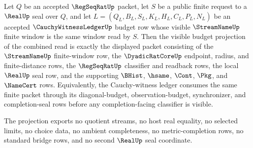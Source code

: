 \begin{theorem}
\label{thm:real-regseqrat-streamname-cauchy-witness-budget-projection}
Let $Q$ be an accepted $\RegSeqRatUp$ packet, let $S$ be a public finite request to a $\RealUp$ seal over $Q$, and let $L=(Q_L,B_L,S_L,K_L,H_L,C_L,P_L,N_L)$ be an accepted $\CauchyWitnessLedgerUp$ budget row whose visible $\StreamNameUp$ finite window is the same window read by $S$. Then the visible budget projection of the combined read is exactly the displayed packet consisting of the $\StreamNameUp$ finite-window row, the $\DyadicRatCoreUp$ endpoint, radius, and finite-distance rows, the $\RegSeqRatUp$ classifier and readback rows, the local $\RealUp$ seal row, and the supporting $\BHist$, $\hsame$, $\Cont$, $\Pkg$, and $\NameCert$ rows. Equivalently, the Cauchy-witness ledger consumes the same finite packet through its diagonal-budget, observation-budget, synchronizer, and completion-seal rows before any completion-facing classifier is visible.

The projection exports no quotient streams, no host real equality, no selected limits, no choice data, no ambient completeness, no metric-completion rows, no standard bridge rows, and no second $\RealUp$ seal coordinate.
\end{theorem}
